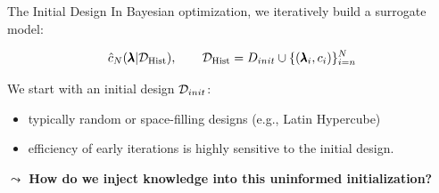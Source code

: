 \documentclass[main]{subfiles}
\begin{document}
\begin{frame}[c]{The Initial Design}
In Bayesian optimization, we iteratively build a surrogate model: 

\begin{equation*}
    \hat{c}_N (\pmb{\lambda} | \mathcal{D}_{\text{Hist}}), \qquad \mathcal{D}_{\text{Hist}} = D_{init} \cup \{(\pmb{\lambda}_i, c_i)\}_{i=n}^N
\end{equation*}

\vspace{0.5cm}
We start with an initial design $\mathcal{D}_{init}$:
\begin{itemize}
    \item typically random or space-filling designs (e.g., Latin Hypercube)
    \item efficiency of early iterations is highly sensitive to the initial design.
\end{itemize}

\vspace{0.5cm}
\textbf{$\leadsto$ How do we inject knowledge into this uninformed initialization?}

\end{frame}
\end{document}
